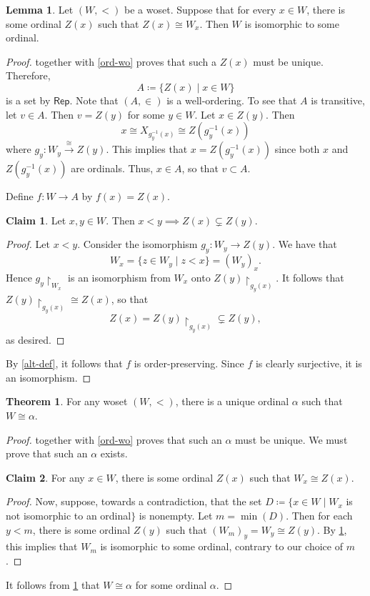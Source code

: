 \documentclass[10pt,letterpaper,cm]{nupset}
\theoremstyle{definition}
\theoremstyle{theorem}
\newtheorem{theorem}[definition]{Theorem}
\newtheorem{lemma}[definition]{Lemma}
\newtheorem*{claim}{Claim}
\theoremstyle{remark}
\newcommand{\1}{\mathbf{1}}
\newcommand{\0}{\vec 0}
\begin{document}
\begin{lemma}\label{PL}
Let $\left(W, <\right)$ be a woset. Suppose that for every $x\in W$, there is some ordinal $Z(x)$ such that $Z(x) \cong W_x$. Then $W$ is isomorphic to some ordinal. 
\end{lemma}
\begin{proof}
 together with \cref{ord-wo} proves that such a $Z(x)$ must be unique. Therefore, $$A\coloneqq \{Z(x) \mid x \in W\}$$ is a set by $\mathsf{Rep}$. Note that $\left(A, \in\right)$ is a well-ordering. To see that $A$ is transitive, let $v\in A$. Then $v = Z(y)$ for some $y\in W$. Let $x\in Z(y)$. Then $$ x \cong X_{g_y^{-1}(x)} \cong Z(g^{-1}_y(x))    $$ where $g_y : W_y \overset{\cong}{\longrightarrow} Z(y)$.  This implies that $x = Z(g^{-1}_y(x))$ since both $x$ and $Z(g^{-1}_y(x))$ are ordinals. Thus, $x \in A$, so that $v\subset A$.

\smallskip

Define $f : W \to A$ by $f(x) = Z(x)$. 
\begin{claim} 
Let $x,y\in W$. Then $x <y \implies Z(x) \subsetneq Z(y)$. 
\end{claim}
\begin{proof}
Let $x<y$. Consider the isomorphism $g_y : W_y \to Z(y)$. We have that $$W_x = \{z\in W_y \mid  z < x\} = \left(W_y\right)_x.$$ Hence $g_y\restriction_{W_x}$ is an isomorphism from $W_x$ onto $Z(y)\restriction_{g_y(x)}$. It follows that $Z(y)\restriction_{g_y(x)} \cong Z(x)$, so that $$Z(x) = Z(y)\restriction_{g_y(x)} \subsetneq Z(y),$$ as desired. 
\end{proof}
By \cref{alt-def}, it follows that $f$ is order-preserving. Since $f$ is clearly surjective, it is an isomorphism.
\end{proof}

\begin{theorem} 
For any woset $\left(W, <\right)$, there is a unique ordinal $\alpha$ such that $W \cong \alpha$.
\end{theorem}
\begin{proof}
 together with \cref{ord-wo} proves that such an $\alpha$ must be unique. We must prove that such an $\alpha$ exists.
\begin{claim}
For any $x\in W$, there is some ordinal $Z(x)$ such that $W_x \cong Z(x)$.
\end{claim}
\begin{proof}
Now, suppose, towards a contradiction, that the set $D\coloneqq \{ x\in W \mid W_x$ is not isomorphic to an ordinal$\}$ is nonempty.   Let $m = \min(D)$. Then for each $y< m$, there is some ordinal $Z(y)$ such that $\left(W_m\right)_y = W_y \cong Z(y)$.  By \cref{PL}, this implies that $W_m$ is isomorphic to some ordinal, contrary to our choice of $m$.
\end{proof}It follows from \cref{PL} that $W \cong \alpha$ for some ordinal $\alpha$.
\end{proof}
\end{document}
